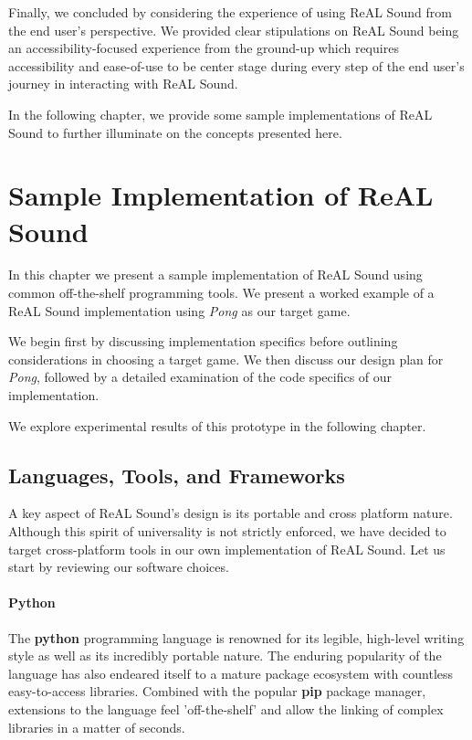 \documentclass{report}
\newcommand{\rs}{ReAL Sound\xspace}
\newcommand{\tech}[1]{\textbf{#1}}
\begin{document}
Finally, we concluded by considering the experience of using \rs from the end user's perspective. We provided clear stipulations on \rs being an accessibility-focused experience from the ground-up which requires accessibility and ease-of-use to be center stage during every step of the end user's journey in interacting with \rs. 

In the following chapter, we provide some sample implementations of \rs to further illuminate on the concepts presented here.




\chapter{Sample Implementation of \rs}

In this chapter we present a sample implementation of \rs using common off-the-shelf programming tools. We present a worked example of a \rs implementation using \emph{Pong} as our target game.

We begin first by discussing implementation specifics before outlining considerations in choosing a target game. We then discuss our design plan for \emph{Pong}, followed by a detailed examination of the code specifics of our implementation. 

We explore experimental results of this prototype in the following chapter.

\section{Languages, Tools, and Frameworks}

A key aspect of \rs's design is its portable and cross platform nature. Although this spirit of universality is not strictly enforced, we have decided to target cross-platform tools in our own implementation of \rs. Let us start by reviewing our software choices. 
\subsubsection{Python}

The \tech{python} programming language is renowned for its legible, high-level writing style as well as its incredibly portable nature. The enduring popularity of the language has also endeared itself to a mature package ecosystem with countless easy-to-access libraries. Combined with the popular \tech{pip} package manager, extensions to the language feel 'off-the-shelf' and allow the linking of complex libraries in a matter of seconds.
\end{document}
